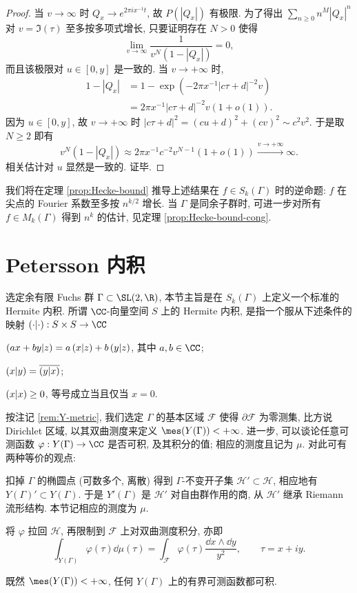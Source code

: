 \begin{proof}
	当 $v \to \infty$ 时 $Q_x \to e^{2\pi ix^{-1} t}$, 故 $P(|Q_x|)$ 有极限. 为了得出 $\sum_{n \geq 0} n^M |Q_x|^n$ 对 $v = \Im(\tau)$ 至多按多项式增长, 只要证明存在 $N > 0$ 使得
	\[ \lim_{v \to \infty} \dfrac{1}{v^N \left( 1 - |Q_x| \right) } = 0, \]
	而且该极限对 $u \in [0, y]$ 是一致的. 当 $v \to +\infty$ 时,
	\begin{align*}
		1 - |Q_x| & =  1 - \exp\left( -2\pi x^{-1} |c\tau + d|^{-2} v \right) \\
		& = 2\pi x^{-1} |c\tau + d|^{-2} v \left( 1 + o(1) \right).
	\end{align*}
	因为 $u \in [0, y]$, 故 $v \to +\infty$ 时 $|c\tau + d|^2 = (cu+d)^2 + (cv)^2 \sim c^2 v^2$. 于是取 $N \geq 2$ 即有
	\[ v^N \left( 1 - |Q_x| \right) \approx 2\pi x^{-1}c^{-2} v^{N-1} (1 + o(1)) \xrightarrow{v \to +\infty} \infty. \]
	相关估计对 $u$ 显然是一致的. 证毕.
\end{proof}

我们将在定理 \ref{prop:Hecke-bound} 推导上述结果在 $f \in S_k(\Gamma)$ 时的逆命题: $f$ 在尖点的 Fourier 系数至多按 $n^{k/2}$ 增长. 当 $\Gamma$ 是同余子群时, 可进一步对所有 $f \in M_k(\Gamma)$ 得到 $n^k$ 的估计, 见定理 \ref{prop:Hecke-bound-cong}.

\section{Petersson 内积}\label{sec:Petersson}
选定余有限 Fuchs 群 $\Gamma \subset \SL(2,\R)$, 本节主旨是在 $S_k(\Gamma)$ 上定义一个标准的 Hermite 内积. 所谓 $\CC$-向量空间 $S$ 上的 Hermite 内积, 是指一个服从下述条件的映射 $\innerp{\cdot}{\cdot}: S \times S \to \CC$
\begin{compactitem}
	\item $\left( ax+by \middle| z \right) = a\left( x \middle| z \right) + b\left( y \middle| z \right)$, 其中 $a,b \in \CC$;
	\item $\left( x \middle| y \right) = \overline{\left( y \middle| x \right)}$;
	\item $\left( x \middle| x \right) \geq 0$, 等号成立当且仅当 $x=0$.
\end{compactitem}

按注记 \ref{rem:Y-metric}, 我们选定 $\Gamma$ 的基本区域 $\mathcal{F}$ 使得 $\partial \mathcal{F}$ 为零测集, 比方说 Dirichlet 区域, 以其双曲测度来定义 $\mes(Y(\Gamma)) < +\infty$. 进一步, 可以谈论任意可测函数 $\varphi: Y(\Gamma) \to \CC$ 是否可积, 及其积分的值; 相应的测度且记为 $\mu$. 对此可有两种等价的观点:
\begin{compactitem}
	\item 扣掉 $\Gamma$ 的椭圆点 (可数多个, 离散) 得到 $\Gamma$-不变开子集 $\mathcal{H}' \subset \mathcal{H}$, 相应地有 $Y(\Gamma)' \subset Y(\Gamma)$. 于是 $Y'(\Gamma)$ 是 $\mathcal{H}'$ 对自由群作用的商, 从 $\mathcal{H}'$ 继承 Riemann 流形结构. 本节记相应的测度为 $\mu$.
	\item 将 $\varphi$ 拉回 $\mathcal{H}$, 再限制到 $\mathcal{F}$ 上对双曲测度积分, 亦即
	\[ \int_{Y(\Gamma)} \varphi(\tau) \dd\mu(\tau) = \int_{\mathcal{F}} \varphi(\tau) \dfrac{\dd x \wedge \dd y}{y^2}, \qquad \tau = x + iy. \]
\end{compactitem}
既然 $\mes(Y(\Gamma)) < +\infty$, 任何 $Y(\Gamma)$ 上的有界可测函数都可积.

